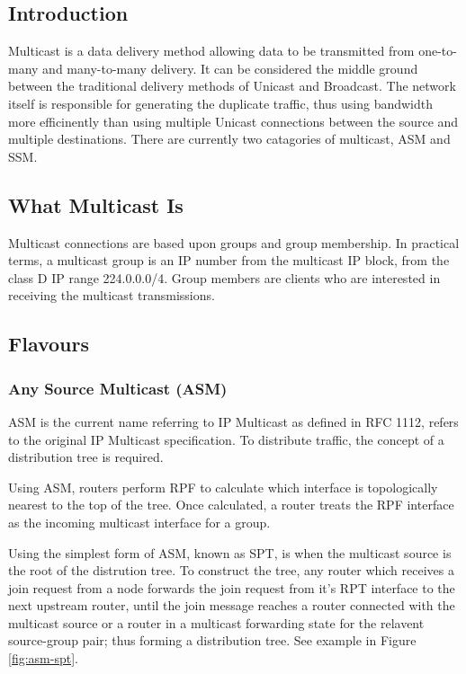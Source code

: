 
\subsection{Introduction}

Multicast is a data delivery method allowing data to be transmitted from
one-to-many and many-to-many delivery. It can be considered the middle
ground between the traditional delivery methods of Unicast and
Broadcast. The network itself is responsible for generating the 
duplicate traffic, thus using bandwidth more efficinently than using 
multiple Unicast connections between the source and multiple 
destinations. There are currently two catagories of multicast, ASM and 
SSM.

\subsection{What Multicast Is}

Multicast connections are based upon groups and group membership. In
practical terms, a multicast group is an IP number from the multicast IP
block, from the class D IP range 224.0.0.0/4. Group members are clients
who are interested in receiving the multicast transmissions.

\subsection{Flavours}

\subsubsection{Any Source Multicast (ASM)}
\label{sec:asm}

ASM is the current name referring to IP Multicast as defined in RFC
1112, refers to the original IP Multicast specification. To distribute
traffic, the concept of a distribution tree is required. 


Using ASM, routers perform RPF to calculate which interface is 
topologically nearest to the top of the tree. Once calculated, a router
treats the RPF interface as the incoming multicast interface for a
group.


Using the simplest form of ASM, known as SPT, is when the multicast
source is the root of the distrution tree. To construct the tree, any
router which receives a join request from a node forwards the join
request from it's RPT interface to the next upstream router, until the 
join message reaches a router connected with the multicast source or a
router in a multicast forwarding state for the relavent source-group
pair; thus forming a distribution tree. See example in Figure 
\ref{fig:asm-spt}.

